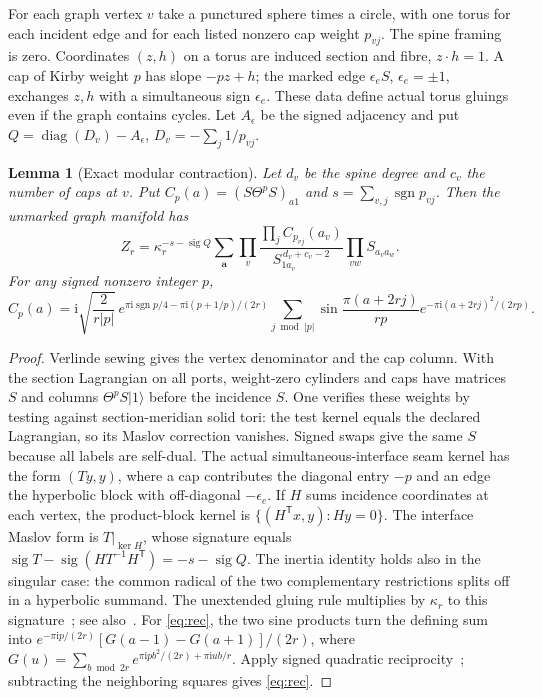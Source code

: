 \documentclass[11pt]{article}
\newtheorem{lemma}[theorem]{Lemma}
\theoremstyle{remark}\newtheorem{remark}[theorem]{Remark}
\DeclareMathOperator{\sgn}{sgn}
\DeclareMathOperator{\sig}{sig}
\newcommand{\ii}{\mathrm i}
\begin{document}
For each graph vertex \(v\) take a punctured sphere times a circle, with one torus for each incident edge and for each listed nonzero cap weight \(p_{vj}\). The spine framing is zero. Coordinates \((z,h)\) on a torus are induced section and fibre, \(z\cdot h=1\). A cap of Kirby weight \(p\) has slope \(-pz+h\); the marked edge \(\epsilon_e S\), \(\epsilon_e=\pm1\), exchanges \(z,h\) with a simultaneous sign \(\epsilon_e\). These data define actual torus gluings even if the graph contains cycles. Let \(A_\epsilon\) be the signed adjacency and put \(Q=\operatorname{diag}(D_v)-A_\epsilon\), \(D_v=-\sum_j1/p_{vj}\).

\begin{lemma}[Exact modular contraction]\label{lem:exact}
Let \(d_v\) be the spine degree and \(c_v\) the number of caps at \(v\). Put \(C_p(a)=(S\Theta^pS)_{a1}\) and \(s=\sum_{v,j}\sgn p_{vj}\). Then the unmarked graph manifold has
\begin{equation}\label{eq:finite}
 Z_r=\kappa_r^{-s-\sig Q}
 \sum_{\boldsymbol a}\prod_v
 \frac{\prod_j C_{p_{vj}}(a_v)}{S_{1a_v}^{\,d_v+c_v-2}}
 \prod_{vw}S_{a_va_w}.
\end{equation}
For any signed nonzero integer \(p\),
\begin{equation}\label{eq:rec}
 C_p(a)=\ii\sqrt{\frac{2}{r|p|}}\,
 e^{\pi\ii\sgn p/4-\pi\ii(p+1/p)/(2r)}
 \sum_{j\bmod|p|}
    \sin\frac{\pi(a+2rj)}{rp}
    e^{-\pi\ii(a+2rj)^2/(2rp)} .
\end{equation}
\end{lemma}
\begin{proof}
Verlinde sewing gives the vertex denominator and the cap column. With the section Lagrangian on all ports, weight-zero cylinders and caps have matrices \(S\) and columns \(\Theta^p S|1\rangle\) before the incidence \(S\). One verifies these weights by testing against section-meridian solid tori: the test kernel equals the declared Lagrangian, so its Maslov correction vanishes. Signed swaps give the same \(S\) because all labels are self-dual. The actual simultaneous-interface seam kernel has the form \((T y,y)\), where a cap contributes the diagonal entry \(-p\) and an edge the hyperbolic block with off-diagonal \(-\epsilon_e\). If \(H\) sums incidence coordinates at each vertex, the product-block kernel is \(\{(H^{\mathsf T}x,y):Hy=0\}\). The interface Maslov form is \(T|_{\ker H}\), whose signature equals \(\sig T-\sig(HT^{-1}H^{\mathsf T})=-s-\sig Q\). The inertia identity holds also in the singular case: the common radical of the two complementary restrictions splits off in a hyperbolic summand. The unextended gluing rule multiplies by \(\kappa_r\) to this signature~\cite[IV.3.5, IV.7.1]{Turaev}; see also~\cite{GilmerMasbaum}. For \eqref{eq:rec}, the two sine products turn the defining sum into \(e^{-\pi\ii p/(2r)}[G(a-1)-G(a+1)]/(2r)\), where \(G(u)=\sum_{b\bmod 2r}e^{\pi\ii p b^2/(2r)+\pi\ii ub/r}\). Apply signed quadratic reciprocity~\cite[Prop.\ 2.3]{Jeffrey}; subtracting the neighboring squares gives \eqref{eq:rec}.
\end{proof}
\end{document}
